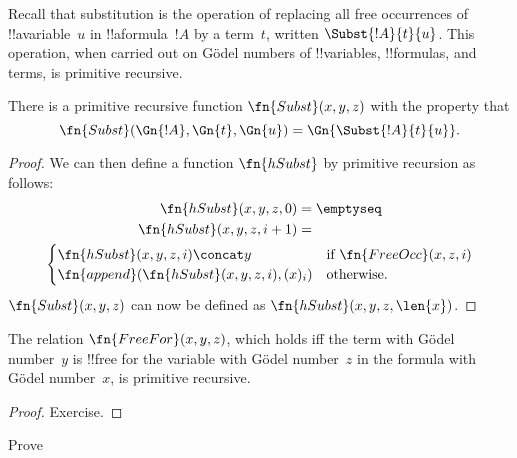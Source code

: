 \documentclass[../../../include/open-logic-section]{subfiles}
\begin{document}

Recall that substitution is the operation of replacing all free
occurrences of !!a{variable}~$u$ in !!a{formula}~$!A$ by a term~$t$,
written $\Subst{!A}{t}{u}$. This operation, when carried out on
G\"odel numbers of !!{variable}s, !!{formula}s, and terms, is
primitive recursive.

\begin{prop}
There is a primitive recursive function $\fn{Subst}(x, y, z)$ with the
property that
\[
\fn{Subst}(\Gn{!A}, \Gn{t}, \Gn{u}) = \Gn{\Subst{!A}{t}{u}}.
\]
\end{prop}

\begin{proof}
We can then define a function $\fn{hSubst}$ by primitive recursion as
follows:
\begin{multline*}
\begin{aligned}
\fn{hSubst}(x, y, z, 0) & = \emptyseq \\
\fn{hSubst}(x, y, z, i+1) & =
\end{aligned}\\
\begin{cases}
\fn{hSubst}(x, y, z, i) \concat y & \text{if $\fn{FreeOcc}(x, z, i)$} \\
\fn{append}(\fn{hSubst}(x, y, z, i), (x)_{i}) & \text{otherwise.}
\end{cases}
\end{multline*}
$\fn{Subst}(x, y, z)$ can now be defined as $\fn{hSubst}(x, y, z, \len{x})$.
\end{proof}

\begin{prop}
The relation $\fn{FreeFor}(x, y, z)$, which holds iff the term with
G\"odel number~$y$ is !!{free for} the variable with G\"odel
number~$z$ in the formula with G\"odel number~$x$, is primitive
recursive.
\end{prop}

\begin{proof} Exercise. \end{proof}

\begin{prob}
Prove 
\end{prob}
\end{document}
